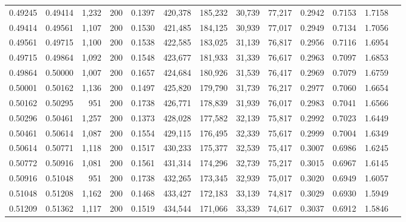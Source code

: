 \begin{tabular}{rrrrrrrrrrrrr}
0.49245 & 0.49414 &  1,232 & 200 &                                     0.1397 & 420,378 & 185,232 &  30,739 &  77,217 & 0.2942 & 0.7153 & 1.7158 \\
0.49414 & 0.49561 &  1,107 & 200 &                                     0.1530 & 421,485 & 184,125 &  30,939 &  77,017 & 0.2949 & 0.7134 & 1.7056 \\
0.49561 & 0.49715 &  1,100 & 200 &                                     0.1538 & 422,585 & 183,025 &  31,139 &  76,817 & 0.2956 & 0.7116 & 1.6954 \\
0.49715 & 0.49864 &  1,092 & 200 &                                     0.1548 & 423,677 & 181,933 &  31,339 &  76,617 & 0.2963 & 0.7097 & 1.6853 \\
0.49864 & 0.50000 &  1,007 & 200 &                                     0.1657 & 424,684 & 180,926 &  31,539 &  76,417 & 0.2969 & 0.7079 & 1.6759 \\
0.50001 & 0.50162 &  1,136 & 200 &                                     0.1497 & 425,820 & 179,790 &  31,739 &  76,217 & 0.2977 & 0.7060 & 1.6654 \\
0.50162 & 0.50295 &    951 & 200 &                                     0.1738 & 426,771 & 178,839 &  31,939 &  76,017 & 0.2983 & 0.7041 & 1.6566 \\
0.50296 & 0.50461 &  1,257 & 200 &                                     0.1373 & 428,028 & 177,582 &  32,139 &  75,817 & 0.2992 & 0.7023 & 1.6449 \\
0.50461 & 0.50614 &  1,087 & 200 &                                     0.1554 & 429,115 & 176,495 &  32,339 &  75,617 & 0.2999 & 0.7004 & 1.6349 \\
0.50614 & 0.50771 &  1,118 & 200 &                                     0.1517 & 430,233 & 175,377 &  32,539 &  75,417 & 0.3007 & 0.6986 & 1.6245 \\
0.50772 & 0.50916 &  1,081 & 200 &                                     0.1561 & 431,314 & 174,296 &  32,739 &  75,217 & 0.3015 & 0.6967 & 1.6145 \\
0.50916 & 0.51048 &    951 & 200 &                                     0.1738 & 432,265 & 173,345 &  32,939 &  75,017 & 0.3020 & 0.6949 & 1.6057 \\
0.51048 & 0.51208 &  1,162 & 200 &                                     0.1468 & 433,427 & 172,183 &  33,139 &  74,817 & 0.3029 & 0.6930 & 1.5949 \\
0.51209 & 0.51362 &  1,117 & 200 &                                     0.1519 & 434,544 & 171,066 &  33,339 &  74,617 & 0.3037 & 0.6912 & 1.5846 \\

\end{tabular}
